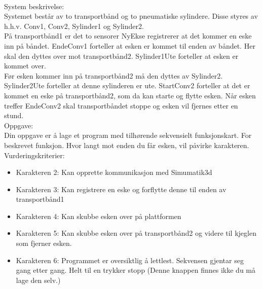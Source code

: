 

\\[0.8cm]
System beskrivelse:\\[0.051cm]

Systemet består av to transportbånd og to pneumatiske sylindere. Disse styres av h.h.v. Conv1, Conv2, Sylinder1 og Sylinder2. \\[0.3cm]

På transportbånd1 er det to sensorer NyEkse registrerer at det kommer en eske inn på båndet. EndeConv1 forteller at esken er kommet til enden av båndet. Her skal den dyttes over mot transportbånd2. Sylinder1Ute forteller at esken er kommet over. \\[0.3cm]

Før esken kommer inn på transportbånd2 må den dyttes av Sylinder2. Sylinder2Ute forteller at denne sylinderen er ute. StartConv2 forteller at det er kommet en eske på transportbånd2, som da kan starte og flytte esken. Når esken treffer EndeConv2 skal transportbåndet stoppe og esken vil fjernes etter en stund. \\[0.3cm]





Oppgave:\\
Din oppgave er å lage et program med tilhørende sekvensielt funksjonskart. For beskrevet funksjon. Hvor langt mot enden du får esken, vil påvirke karakteren. \\[0.5cm]
Vurderingskriterier:
\begin{itemize}[noitemsep]
	\item Karakteren 2: Kan opprette kommunikasjon med Simumatik3d
	\item Karakteren 3: Kan registrere en eske og forflytte denne til enden av transportbånd1
	\item Karakteren 4: Kan skubbe esken over på plattformen
	\item Karakteren 5: Kan skubbe esken over på transportbånd2 og videre til kjeglen som fjerner esken. 
	\item Karakteren 6: Programmet er oversiktlig å lettlest. Sekvensen gjentar seg gang etter gang. Helt til en trykker stopp (Denne knappen finnes ikke du må lage den selv.)
\end{itemize}

